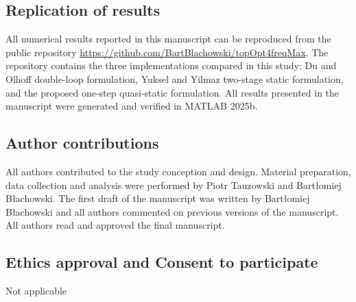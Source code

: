 \documentclass[pdflatex,lineno,sn-mathphys-ay]{sn-jnl}
\begin{document}
\subsection*{Replication of results}
All numerical results reported in this manuscript can be reproduced from the public repository \href{https://github.com/BartBlachowski/topOpt4freqMax}{https://github.com/BartBlachowski/topOpt4freqMax}. The repository contains the three implementations compared in this study: Du and Olhoff double-loop formulation, Yuksel and Yilmaz two-stage static formulation, and the proposed one-step quasi-static formulation. All results presented in the manuscript were generated and verified in MATLAB 2025b.

\subsection*{Author contributions}
All authors contributed to the study conception and design. Material preparation, data collection and analysis were performed by Piotr Tauzowski and Bartłomiej Błachowski. The first draft of the manuscript was written by Bartłomiej Błachowski and all authors commented on previous versions of the manuscript. All authors read and approved the final manuscript.

\subsection*{Ethics approval and Consent to participate 
}
Not applicable


\end{document}
